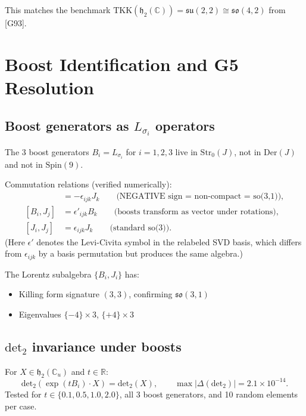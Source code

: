 This matches the benchmark $\mathrm{TKK}(\mathfrak{h}_2(\mathbb{C}))
= \mathfrak{su}(2,2) \cong \mathfrak{so}(4,2)$ from [G93].

\section{Boost Identification and G5 Resolution}

\subsection{Boost generators as $L_{\sigma_i}$ operators}

The 3 boost generators $B_i = L_{\sigma_i}$ for $i = 1,2,3$ live in
$\mathrm{Str}_0(J)$, not in $\mathrm{Der}(J)$ and not in $\mathrm{Spin}(9)$.

Commutation relations (verified numerically):
\begin{align}
  [B_i, B_j] &= -\epsilon_{ijk} J_k \qquad \text{(NEGATIVE sign = non-compact = so(3,1))}, \\
  [B_i, J_j] &= \epsilon'_{ijk} B_k \qquad \text{(boosts transform as vector under rotations)}, \\
  [J_i, J_j] &= \epsilon_{ijk} J_k \qquad \text{(standard so(3))}.
\end{align}
(Here $\epsilon'$ denotes the Levi-Civita symbol in the relabeled SVD basis,
which differs from $\epsilon_{ijk}$ by a basis permutation but produces the
same algebra.)

The Lorentz subalgebra $\{B_i, J_i\}$ has:
\begin{itemize}
  \item Killing form signature $(3, 3)$, confirming $\mathfrak{so}(3,1)$
  \item Eigenvalues $\{-4\} \times 3$, $\{+4\} \times 3$
\end{itemize}

\subsection{$\mathrm{det}_2$ invariance under boosts}

For $X \in \mathfrak{h}_2(\mathbb{C}_u)$ and $t \in \mathbb{R}$:
\begin{equation}
  \mathrm{det}_2(\exp(t B_i) \cdot X) = \mathrm{det}_2(X), \qquad
  \max |\Delta(\mathrm{det}_2)| = 2.1 \times 10^{-14}.
\end{equation}
Tested for $t \in \{0.1, 0.5, 1.0, 2.0\}$, all 3 boost generators, and 10
random elements per case.

